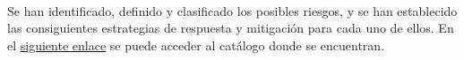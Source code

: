 \newcommand{\riesgos}[2]{\href{run:xls/#1.xls}{#2}}

\paragraph{} Se han identificado, definido y clasificado los posibles riesgos, y se han establecido las consiguientes estrategias de respuesta y mitigación para cada uno de ellos.
En el \riesgos{registro_de_riesgos}{siguiente enlace} se puede acceder al catálogo donde se encuentran.
